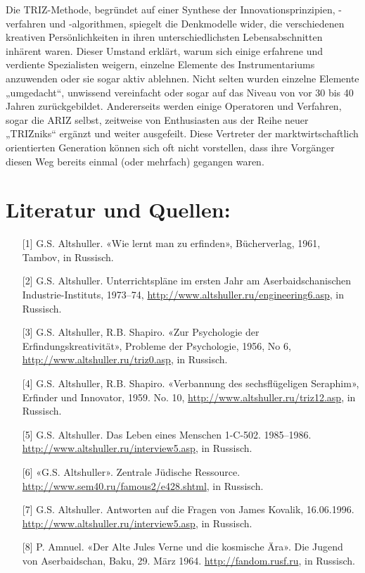 \documentclass[11pt,a4paper]{article}
\begin{document}
Die TRIZ-Methode, begründet auf einer Synthese der Innovationsprinzipien,
-verfahren und -algorithmen, spiegelt die Denkmodelle wider, die verschiedenen
kreativen Persönlichkeiten in ihren unterschiedlichsten Lebensabschnitten
inhärent waren. Dieser Umstand erklärt, warum sich einige erfahrene und
verdiente Spezialisten weigern, einzelne Elemente des Instrumentariums
anzuwenden oder sie sogar aktiv ablehnen. Nicht selten wurden einzelne
Elemente „umgedacht“, unwissend vereinfacht oder sogar auf das Niveau von vor
30 bis 40 Jahren zurückgebildet.  Andererseits werden einige Operatoren und
Verfahren, sogar die ARIZ selbst, zeitweise von Enthusiasten aus der Reihe
neuer „TRIZniks“ ergänzt und weiter ausgefeilt. Diese Vertreter der
marktwirtschaftlich orientierten Generation können sich oft nicht vorstellen,
dass ihre Vorgänger diesen Weg bereits einmal (oder mehrfach) gegangen waren.

\section*{Literatur und Quellen:}
\begin{itemize}
\item[{[1]}] G.S. Altshuller. «Wie lernt man zu erfinden», Bücherverlag, 1961,
  Tambov, in Russisch.
\item[{[2]}] G.S. Altshuller. Unterrichtspläne im ersten Jahr am
  Aserbaidschanischen Industrie-Instituts, 1973--74,
  \url{http://www.altshuller.ru/engineering6.asp}, in Russisch.
\item[{[3]}] G.S. Altshuller, R.B. Shapiro. «Zur Psychologie der
  Erfindungskreativität», Probleme der Psychologie, 1956, No 6,
  \url{http://www.altshuller.ru/triz0.asp}, in Russisch.
\item[{[4]}] G.S. Altshuller, R.B. Shapiro. «Verbannung des sechsflügeligen
  Seraphim», Erfinder und Innovator, 1959.  No. 10,
  \url{http://www.altshuller.ru/triz12.asp}, in Russisch.
\item[{[5]}] G.S. Altshuller. Das Leben eines Menschen 1-C-502. 1985--1986.\\
  \url{http://www.altshuller.ru/interview5.asp}, in Russisch.
\item[{[6]}] «G.S. Altshuller». Zentrale Jüdische Ressource.\\
  \url{http://www.sem40.ru/famous2/e428.shtml}, in Russisch.
\item[{[7]}] G.S. Altshuller. Antworten auf die Fragen von James Kovalik,
  16.06.1996.\\ \url{http://www.altshuller.ru/interview5.asp}, in Russisch.
\item[{[8]}] P. Amnuel. «Der Alte Jules Verne und die kosmische Ära». Die
  Jugend von Aserbaidschan, Baku, 29. März 1964. \url{http://fandom.rusf.ru},
  in Russisch.
\end{itemize}
\end{document}
